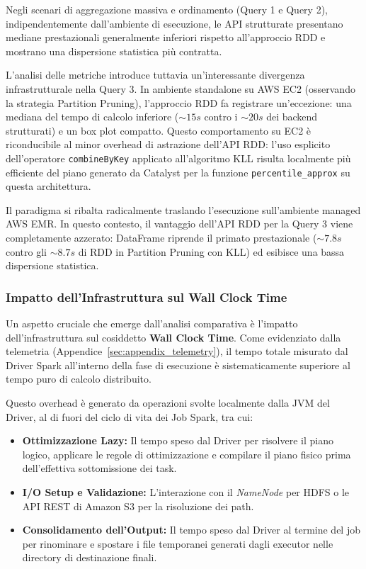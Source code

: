 \documentclass[conference]{IEEEtran}
\begin{document}
Negli scenari di aggregazione massiva e ordinamento (Query 1 e Query 2), indipendentemente dall'ambiente di esecuzione, le API strutturate presentano mediane prestazionali generalmente inferiori rispetto all'approccio RDD e mostrano una dispersione statistica più contratta.

L'analisi delle metriche introduce tuttavia un'interessante divergenza infrastrutturale nella Query 3.
In ambiente standalone su AWS EC2 (osservando la strategia Partition Pruning), l'approccio RDD fa registrare un'eccezione: una mediana del tempo di calcolo inferiore ($\sim 15s$ contro i $\sim 20s$ dei backend strutturati) e un box plot compatto.
Questo comportamento su EC2 è riconducibile al minor overhead di astrazione dell'API RDD: l'uso esplicito dell'operatore \texttt{combineByKey} applicato all'algoritmo KLL risulta localmente più efficiente del piano generato da Catalyst per la funzione \texttt{percentile\_approx} su questa architettura.

Il paradigma si ribalta radicalmente traslando l'esecuzione sull'ambiente managed AWS EMR. In questo contesto, il vantaggio dell'API RDD per la Query 3 viene completamente azzerato: DataFrame riprende il primato prestazionale ($\sim 7.8s$ contro gli $\sim 8.7s$ di RDD in Partition Pruning con KLL) ed esibisce una bassa dispersione statistica.

\subsubsection{Impatto dell'Infrastruttura sul Wall Clock Time}
Un aspetto cruciale che emerge dall'analisi comparativa è l'impatto dell'infrastruttura sul cosiddetto \textbf{Wall Clock Time}.
Come evidenziato dalla telemetria (Appendice~\ref{sec:appendix_telemetry}), il tempo totale misurato dal Driver Spark all'interno della fase di esecuzione è sistematicamente superiore al tempo puro di calcolo distribuito.

Questo overhead è generato da operazioni svolte localmente dalla JVM del Driver, al di fuori del ciclo di vita dei Job Spark, tra cui:
\begin{itemize}
    \item \textbf{Ottimizzazione Lazy:} Il tempo speso dal Driver per risolvere il piano logico, applicare le regole di ottimizzazione e compilare il piano fisico prima dell'effettiva sottomissione dei task.
    \item \textbf{I/O Setup e Validazione:} L'interazione con il \textit{NameNode} per HDFS o le API REST di Amazon S3 per la risoluzione dei path.
    \item \textbf{Consolidamento dell'Output:} Il tempo speso dal Driver al termine del job per rinominare e spostare i file temporanei generati dagli executor nelle directory di destinazione finali.
\end{itemize}
\end{document}
